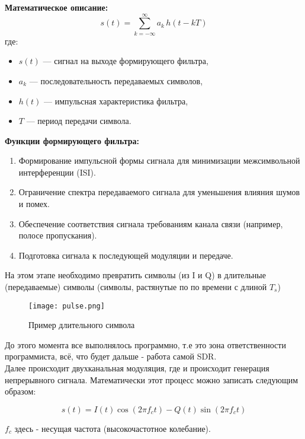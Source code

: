 \textbf{Математическое описание:}
\[
s(t) = \sum_{k=-\infty}^{\infty} a_k \, h(t - kT)
\]
где:
\begin{itemize}
    \item $s(t)$ --- сигнал на выходе формирующего фильтра,
    \item $a_k$ --- последовательность передаваемых символов,
    \item $h(t)$ --- импульсная характеристика фильтра,
    \item $T$ --- период передачи символа.
\end{itemize}

\textbf{Функции формирующего фильтра:}
\begin{enumerate}
    \item Формирование импульсной формы сигнала для минимизации межсимвольной интерференции (ISI).
    \item Ограничение спектра передаваемого сигнала для уменьшения влияния шумов и помех.
    \item Обеспечение соответствия сигнала требованиям канала связи (например, полосе пропускания).
    \item Подготовка сигнала к последующей модуляции и передаче.
\end{enumerate}

На этом этапе необходимо превратить символы (из I и Q) в длительные (передаваемые) символы (символы, растянутые по по времени с длиной $T_s$)

\begin{figure}[H]
    \centering
    \texttt{[image: pulse.png]}
    \caption{Пример длительного символа}
\end{figure}

До этого момента все выполнялось программно, т.е это зона ответственности программиста, всё, что будет дальше - работа самой SDR. \\

Далее происходит двухканальная модуляция, где и происходит генерация непрерывного сигнала. Математически этот процесс можно записать
следующим образом:

$$s(t) = I(t)\cos(2\pi f_c t) - Q(t)\sin(2\pi f_c t)$$

$f_c$ здесь - несущая частота (высокочастотное колебание).

\endinput